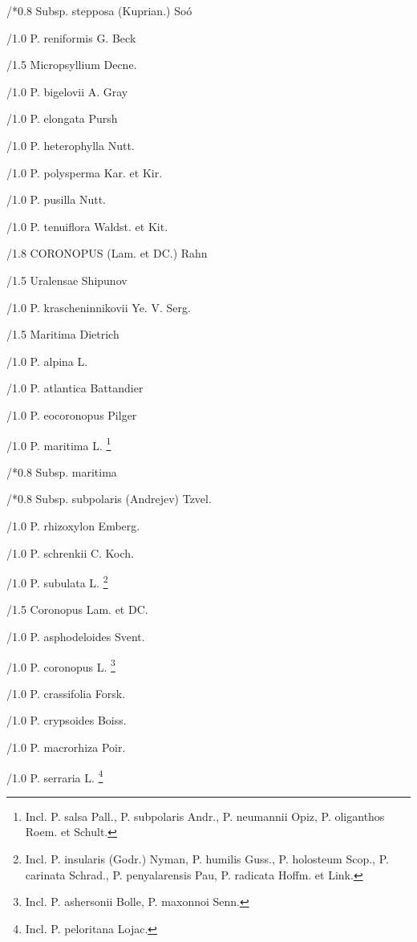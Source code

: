 \documentclass{article}
\begin{document}
\begin{classif}{1.0}
        /*0.8 {Subsp.} stepposa (Kuprian.) So\'o

        /1.0 {P. reniformis} G. Beck

/1.5 Micropsyllium Decne.

        /1.0 {P. bigelovii} A. Gray

        /1.0 {P. elongata} Pursh

        /1.0 {P. heterophylla} Nutt.

        /1.0 {P. polysperma} Kar. et Kir.

        /1.0 {P. pusilla} Nutt.

        /1.0 {P. tenuiflora} Waldst. et Kit.

/1.8 CORONOPUS (Lam. et DC.) Rahn

/1.5 Uralensae Shipunov

        /1.0 {P. krascheninnikovii} Ye. V. Serg.

/1.5 Maritima Dietrich

        /1.0 {P. alpina} L.

        /1.0 {P. atlantica} Battandier

        /1.0 {P. eocoronopus} Pilger

        /1.0 {P. maritima} L. \footnote{Incl. \KURN P. salsa
        Pall., \KURN P. subpolaris Andr., \KURN P. neumannii
        Opiz, \KURN P. oliganthos Roem. et Schult.}

        /*0.8 {Subsp.} maritima

        /*0.8 {Subsp.} subpolaris (Andrejev) Tzvel.

        /1.0 {P. rhizoxylon} Emberg.

        /1.0 {P. schrenkii} C. Koch.

        /1.0 {P. subulata} L. \footnote{Incl. \KURN P. insularis
        (Godr.) Nyman, \KURN P. humilis Guss., \KURN P.
        holosteum Scop., \KURN P. carinata Schrad., \KURN P.
        penyalarensis Pau, \KURN P. radicata Hoffm. et Link.}

/1.5 Coronopus Lam. et DC.

        /1.0 {P. asphodeloides} Svent.

        /1.0 {P. coronopus} L. \footnote{Incl. \KURN P.
        ashersonii Bolle, \KURN P. maxonnoi Senn.}

        /1.0 {P. crassifolia} Forsk.

        /1.0 {P. crypsoides} Boiss.

        /1.0 {P. macrorhiza} Poir.

        /1.0 {P. serraria} L. \footnote{Incl. \KURN P.
        peloritana Lojac.}


\end{classif}
\end{document}
